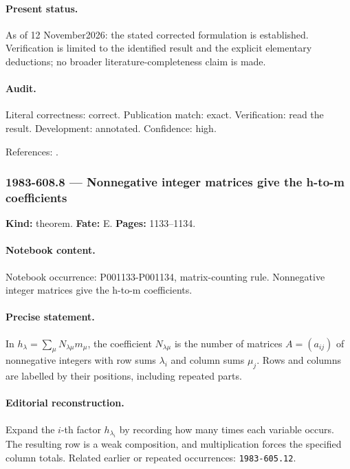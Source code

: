 \paragraph{Present status.} As of 12 November2026: the stated corrected formulation is established. Verification is limited to the identified result and the explicit elementary deductions; no broader literature-completeness claim is made.

\paragraph{Audit.} Literal correctness: correct. Publication match: exact. Verification: read the result. Development: annotated. Confidence: high.

\noindent References: \citep{macdonald1995symmetric}.\par

\subsubsection{1983-608.8 --- Nonnegative integer matrices give the h-to-m coefficients}

\label{item:1983-608.8}

\noindent\textbf{Kind:} theorem. \textbf{Fate:} E. \textbf{Pages:} 1133--1134.\par

\paragraph{Notebook content.} Notebook occurrence: P001133-P001134, matrix-counting rule. Nonnegative integer matrices give the h-to-m coefficients.

\paragraph{Precise statement.} In \(h_\lambda=\sum_{\mu}N_{\lambda\mu}m_\mu\), the coefficient \(N_{\lambda\mu}\) is the number of matrices \(A=(a_{ij})\) of nonnegative integers with row sums \(\lambda_i\) and column sums \(\mu_j\). Rows and columns are labelled by their positions, including repeated parts.

\paragraph{Editorial reconstruction.} Expand the \(i\)-th factor \(h_{\lambda_i}\) by recording how many times each variable occurs. The resulting row is a weak composition, and multiplication forces the specified column totals. Related earlier or repeated occurrences: \texttt{1983-605.12}.

